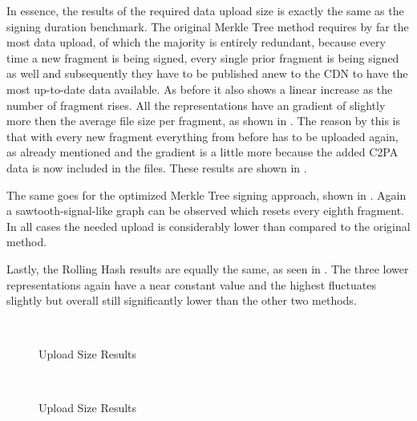 In essence, the results of the required data upload size is exactly the same as the signing duration benchmark. The original Merkle Tree method requires by far the most data upload, of which the majority is entirely redundant, because every time a new fragment is being signed, every single prior fragment is being signed as well and subsequently they have to be published anew to the CDN to have the most up-to-date data available. As before it also shows a linear increase as the number of fragment rises. All the representations have an gradient of slightly more then the average file size per fragment, as shown in . The reason by this is that with every new fragment everything from before has to be uploaded again, as already mentioned and the gradient is a little more because the added C2PA data is now included in the files. These results are shown in .

The same goes for the optimized Merkle Tree signing approach, shown in . Again a sawtooth-signal-like graph can be observed which resets every eighth fragment. In all cases the needed upload is considerably lower than compared to the original method.

Lastly, the Rolling Hash results are equally the same, as seen in . The three lower representations again have a near constant value and the highest fluctuates slightly but overall still significantly lower than the other two methods.

\begin{figure}
    \centering
     \\
    \caption{Upload Size Results}
    \label{fig:upload1}
\end{figure}

\begin{figure}
    \centering
     \\
    \caption{Upload Size Results}
    \label{fig:upload2}
\end{figure}

